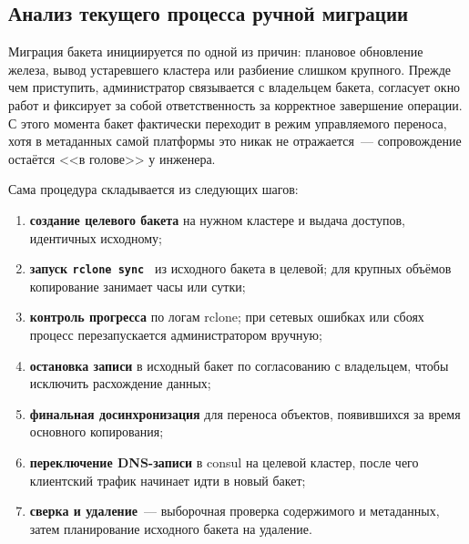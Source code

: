 \subsection{Анализ текущего процесса ручной миграции}\label{subsec:manual-migration}

Миграция бакета инициируется по одной из причин: плановое обновление железа, вывод устаревшего кластера или разбиение слишком крупного.
Прежде чем приступить, администратор связывается с владельцем бакета, согласует окно работ и фиксирует за собой ответственность за корректное завершение операции.
С этого момента бакет фактически переходит в режим управляемого переноса, хотя в метаданных самой платформы это никак не отражается~--- сопровождение остаётся <<в голове>> у инженера.

Сама процедура складывается из следующих шагов:
\begin{enumerate}
    \item \textbf{создание целевого бакета} на нужном кластере и выдача доступов, идентичных исходному;
    \item \textbf{запуск \texttt{rclone sync}}~\cite{rclone-docs} из исходного бакета в целевой; для крупных объёмов копирование занимает часы или сутки;
    \item \textbf{контроль прогресса} по логам \gls{rclone}; при сетевых ошибках или сбоях процесс перезапускается администратором вручную;
    \item \textbf{остановка записи} в исходный бакет по согласованию с владельцем, чтобы исключить расхождение данных;
    \item \textbf{финальная досинхронизация} для переноса объектов, появившихся за время основного копирования;
    \item \textbf{переключение DNS-записи} в \gls{consul} на целевой кластер, после чего клиентский трафик начинает идти в новый бакет;
    \item \textbf{сверка и удаление}~--- выборочная проверка содержимого и метаданных, затем планирование исходного бакета на удаление.
\end{enumerate}

